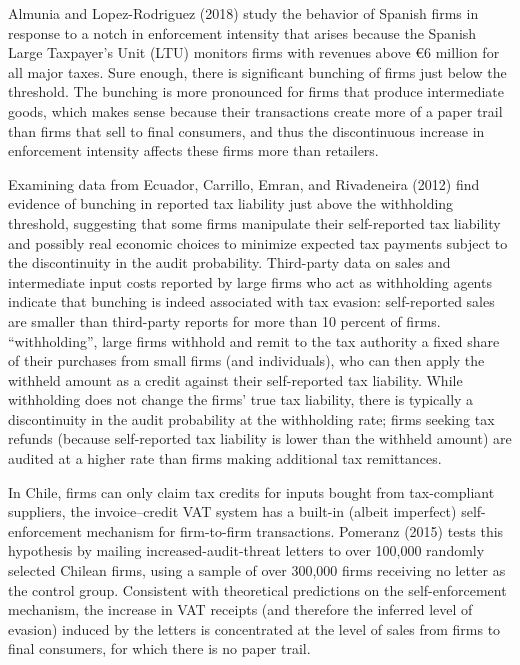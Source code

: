 \documentclass[
  12pt]{article}
\theoremstyle{definition}
\theoremstyle{remark}
\begin{document}
Almunia and Lopez-Rodriguez (2018) study the behavior of Spanish firms
in response to a notch in enforcement intensity that arises because the
Spanish Large Taxpayer's Unit (LTU) monitors firms with revenues above
€6 million for all major taxes. Sure enough, there is significant
bunching of firms just below the threshold. The bunching is more
pronounced for firms that produce intermediate goods, which makes sense
because their transactions create more of a paper trail than firms that
sell to final consumers, and thus the discontinuous increase in
enforcement intensity affects these firms more than retailers.

Examining data from Ecuador, Carrillo, Emran, and Rivadeneira (2012)
find evidence of bunching in reported tax liability just above the
withholding threshold, suggesting that some firms manipulate their
self-reported tax liability and possibly real economic choices to
minimize expected tax payments subject to the discontinuity in the audit
probability. Third-party data on sales and intermediate input costs
reported by large firms who act as withholding agents indicate that
bunching is indeed associated with tax evasion: self-reported sales are
smaller than third-party reports for more than 10 percent of firms.
``withholding'', large firms withhold and remit to the tax authority a
fixed share of their purchases from small firms (and individuals), who
can then apply the withheld amount as a credit against their
self-reported tax liability. While withholding does not change the
firms' true tax liability, there is typically a discontinuity in the
audit probability at the withholding rate; firms seeking tax refunds
(because self-reported tax liability is lower than the withheld amount)
are audited at a higher rate than firms making additional tax
remittances.

In Chile, firms can only claim tax credits for inputs bought from
tax-compliant suppliers, the invoice--credit VAT system has a built-in
(albeit imperfect) self-enforcement mechanism for firm-to-firm
transactions. Pomeranz (2015) tests this hypothesis by mailing
increased-audit-threat letters to over 100,000 randomly selected Chilean
firms, using a sample of over 300,000 firms receiving no letter as the
control group. Consistent with theoretical predictions on the
self-enforcement mechanism, the increase in VAT receipts (and therefore
the inferred level of evasion) induced by the letters is concentrated at
the level of sales from firms to final consumers, for which there is no
paper trail.
\end{document}
